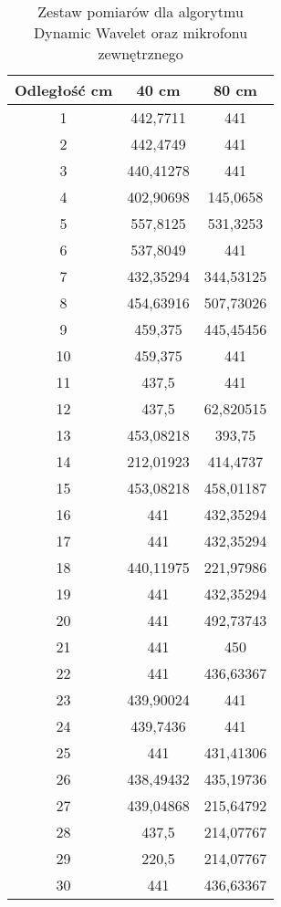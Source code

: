 \begin{table}
\begin{center}
\caption[Zestaw pomiarów dla algorytmu Dynamic Wavelet oraz mikrofonu zewnętrznego]{Zestaw pomiarów dla algorytmu Dynamic Wavelet oraz mikrofonu zewnętrznego}
\begin{tabular}{|c|c|c|}
\hline
{\bf Odległość cm} & {\bf 40 cm} & {\bf 80 cm} \\ 
\hline
1  & 442,7711  & 441       \\ \hline
2  & 442,4749  & 441       \\ \hline
3  & 440,41278 & 441       \\ \hline
4  & 402,90698 & 145,0658  \\ \hline
5  & 557,8125  & 531,3253  \\ \hline
6  & 537,8049  & 441       \\ \hline
7  & 432,35294 & 344,53125 \\ \hline
8  & 454,63916 & 507,73026 \\ \hline
9  & 459,375   & 445,45456 \\ \hline
10 & 459,375   & 441       \\ \hline
11 & 437,5     & 441       \\ \hline
12 & 437,5     & 62,820515 \\ \hline
13 & 453,08218 & 393,75    \\ \hline
14 & 212,01923 & 414,4737  \\ \hline
15 & 453,08218 & 458,01187 \\ \hline
16 & 441       & 432,35294 \\ \hline
17 & 441       & 432,35294 \\ \hline
18 & 440,11975 & 221,97986 \\ \hline
19 & 441       & 432,35294 \\ \hline
20 & 441       & 492,73743 \\ \hline
21 & 441       & 450       \\ \hline
22 & 441       & 436,63367 \\ \hline
23 & 439,90024 & 441       \\ \hline
24 & 439,7436  & 441       \\ \hline
25 & 441       & 431,41306 \\ \hline
26 & 438,49432 & 435,19736 \\ \hline
27 & 439,04868 & 215,64792 \\ \hline
28 & 437,5     & 214,07767 \\ \hline
29 & 220,5     & 214,07767 \\ \hline
30 & 441       & 436,63367 \\ \hline
\end{tabular}
\label{table:przyklad}
\end{center}
\end{table}


